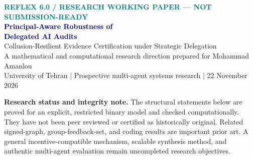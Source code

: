 \documentclass[10pt,a4paper]{article}
\theoremstyle{definition}\newtheorem{definition}[theorem]{Definition}
\newcommand{\Princ}{\mathcal P}
\begin{document}
\begin{center}
{\footnotesize\bfseries\textcolor{teal}{REFLEX 6.0 / RESEARCH WORKING PAPER --- NOT SUBMISSION-READY}}\\[6pt]
{\LARGE\bfseries\textcolor{navy}{Principal-Aware Robustness of\\[3pt] Delegated AI Audits}}\\[6pt]
{\large Collusion-Resilient Evidence Certification under Strategic Delegation}\\[8pt]
{\small A mathematical and computational research direction prepared for Mohammad Amanlou}\\[3pt]
{\footnotesize\textcolor{muted}{University of Tehran | Prospective multi-agent systems research | 22 November 2026}}
\end{center}
\par\vspace{4pt}
\vspace{4pt}
\noindent\colorbox{navy!6}{\parbox{0.967\linewidth}{\small\textbf{Research status and integrity note.} The structural statements below are proved for an explicit, restricted binary model and checked computationally. They have not been peer reviewed or certified as historically original. Related signed-graph, group-feedback-set, and coding results are important prior art. A general incentive-compatible mechanism, scalable synthesis method, and authentic multi-agent evaluation remain uncompleted research objectives.}}
\vspace{10pt}
\begin{abstract}
When a human principal delegates to multiple AI agents, ordinary edge-error budgets overstate independence: one colluding principal may control many delegates and corrupt every report incident to them. We study a binary, authority-labelled audit graph with arbitrary nuisance offsets and an adversary that compromises at most $k$ \emph{distinct principals}, not $k$ agent identities or individual edges. We characterize robust identifiability exactly by a principal-labelled signed-cycle transversal: $\tau_{\Princ}(G,b)>2k$. We give a constructive hypothesis feasibility decoder, a compact owner-disjoint-cycle certificate, a counterexample to edge-level robustness, monotonicity laws for safe network refinements, and a small exact audit-design solver. Our random exhaustive tests (120 small graphs), attack trials (2,000), and a 12-edge optimal-design instance pass. We distinguish these confirmed restricted-model results from the unresolved higher-value goal: synthesizing minimal-cost, \emph{incentive-compatible}, principal-aware audit institutions under dynamic delegation, uncertain evidence provenance, and adversarial equilibrium selection. The paper is a defensible technical foundation and research agenda, \emph{not} an accepted novelty claim.
\end{abstract}
\end{document}
